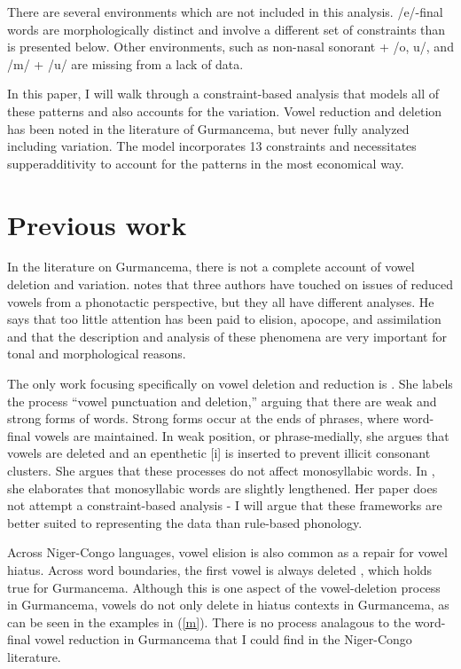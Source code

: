 \documentclass[output=paper,newtxmath,modfonts,nonflat,draftmode]{langsci/langscibook}
\begin{document}
\z

There are several environments which are not included in this analysis. /e/-final words are morphologically distinct and involve a different set of constraints than is presented below. Other environments, such as non-nasal sonorant + /o, u/, and /m/ + /u/ are missing from a lack of data. 

In this paper, I will walk through a constraint-based analysis that models all of these patterns and also accounts for the variation. Vowel reduction and deletion has been noted in the literature of Gurmancema, but never fully analyzed including variation. The model incorporates 13 constraints and necessitates supperadditivity \citep{AlbrightMagri,GreenDavis14} to account for the patterns in the most economical way. 



\section{Previous work} \label{sec:baird:3}

In the literature on Gurmancema, there is not a complete account of vowel deletion and variation. \citet{Naba1994} notes that three authors have touched on issues of reduced vowels from a phonotactic perspective, but they all have different analyses. He says that too little attention has been paid to elision, apocope, and assimilation and that the description and analysis of these phenomena are very important for tonal and morphological reasons.

The only work focusing specifically on vowel deletion and reduction is \citet{Rialland1980,Rialland2001}. She labels the process “vowel punctuation and deletion,'' arguing that there are weak and strong forms of words.  Strong forms occur at the ends of phrases, where word-final vowels are maintained. In weak position, or phrase-medially, she argues that vowels are deleted and an epenthetic [i] is inserted to prevent illicit consonant clusters. She argues that these processes do not affect monosyllabic words. In \citet{Rialland2001}, she elaborates that monosyllabic words are slightly lengthened. Her paper does not attempt a constraint-based analysis - I will argue that these frameworks are better suited to representing the data than rule-based phonology. 
	
Across Niger-Congo languages, vowel elision is also common as a repair for vowel hiatus. Across word boundaries, the first vowel is always deleted \citep{Casali1997}, which holds true for Gurmancema. Although this is one aspect of the vowel-deletion process in Gurmancema, vowels do not only delete in hiatus contexts in Gurmancema, as can be seen in the examples in (\ref{m}). There is no process analagous to the word-final vowel reduction in Gurmancema that I could find in the Niger-Congo literature. 
 
\end{document}
